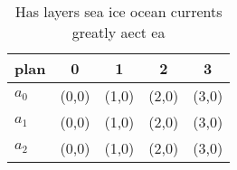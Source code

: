 \documentclass[a4paper]{article}
\begin{document}
\begin{table}
\begin{adjustbox}{width=0.6\columnwidth}
\begin{tabular}{|l|l|l|l|l|}
\hline
\textbf{plan} & \multicolumn{1}{c|}{\textbf{0}} & \multicolumn{1}{c|}{\textbf{1}} & \multicolumn{1}{c|}{\textbf{2}} & \multicolumn{1}{c|}{\textbf{3}} \\ \hline
\textbf{$a_0$}  & (0,0) & (1,0) & (2,0) & (3,0) \\ \hline
\textbf{$a_1$}  & (0,0) & (1,0) & (2,0) & (3,0) \\ \hline
\textbf{$a_2$}  & (0,0) & (1,0) & (2,0) & (3,0) \\ \hline
\end{tabular}
\end{adjustbox}
\caption{Has layers sea ice ocean currents greatly aect ea
}
\end{table}
\end{document}
